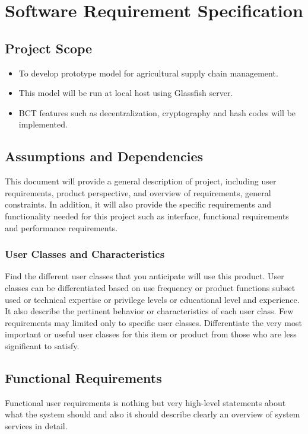 \documentclass[oneside,a4paper,12pt]{report}
\begin{document}
\chapter{Software Requirement Specification}


\section{Project Scope}
\begin{itemize}
\item To develop prototype model for agricultural supply chain management.
\item This model will be run at local host using Glassfish server.
\item BCT features such as decentralization, cryptography and hash codes will be implemented.
\end{itemize}

\section{Assumptions and Dependencies}
\hspace*{0.5cm} This document will provide a general description of project, including user requirements, product perspective, and overview of requirements, general constraints. In addition, it will also provide the specific requirements and functionality needed for this project such as interface, functional requirements and performance requirements.

\subsection{User Classes and Characteristics}
\hspace*{0.5cm} Find the different user classes that you anticipate will use this product. User classes can be differentiated based on use frequency or product functions subset used or technical expertise or privilege levels or educational level and experience. It also describe the pertinent behavior or characteristics of each user class. Few requirements may limited only to specific user classes. Differentiate the very most important or useful user classes for this item or product from those who are less significant to satisfy.

\section{Functional Requirements}
\hspace*{0.5cm} Functional user requirements is nothing but very high-level statements about what the system should and also it should describe clearly an overview of  system services in detail.
\end{document}
